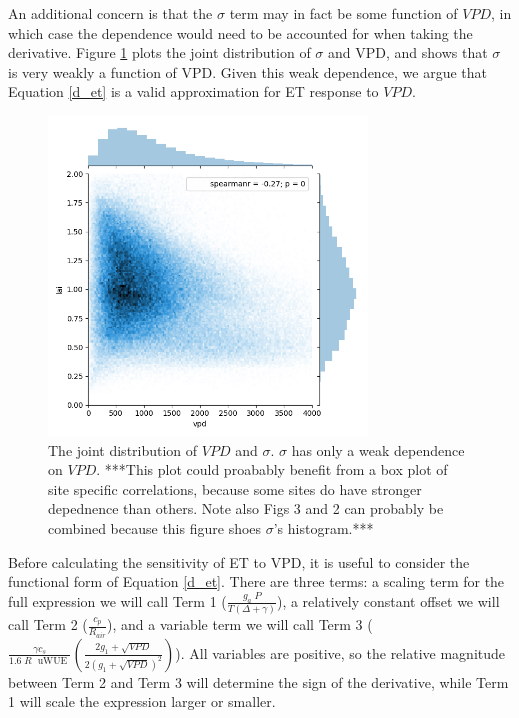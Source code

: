 \documentclass[draft,linenumbers]{agujournal}
\begin{document}
An additional concern is that the $\sigma$ term may in fact be some function of $VPD$, in which case the dependence would need to be accounted for when taking the derivative. Figure \ref{lai_vpd_fig} plots the joint distribution of $\sigma$ and VPD, and shows that $\sigma$ is very weakly a function of VPD. Given this weak dependence, we argue that Equation \ref{d_et} is a valid approximation for ET response to $VPD$.

\begin{figure}[h]
\centering
\includegraphics[width=20pc]{./fig03.png}
\caption{The joint distribution of $VPD$ and $\sigma$. $\sigma$ has only a weak dependence on $VPD$. ***This plot could proabably benefit from a box plot of site specific correlations, because some sites do have stronger depednence than others. Note also Figs 3 and 2 can probably be combined because this figure shoes $\sigma$'s histogram.***}
\label{lai_vpd_fig}
\end{figure}

Before calculating the sensitivity of ET to VPD, it is useful to consider the functional form of Equation \ref{d_et}. There are three terms: a scaling term for the full expression we will call Term 1 ($\frac{g_a \; P}{T(\Delta + \gamma)}$), a relatively constant offset we will call Term 2 ($\frac{c_p}{R_{air}}$), and a variable term we will call Term 3 ($\frac{\gamma c_s }{1.6 \; R\; \text{ uWUE }} \left( \frac{2 g_1 + \sqrt{VPD}}{2 (g_1 + \sqrt{VPD})^2}\right)$). All variables are positive, so the relative magnitude between Term 2 and Term 3 will determine the sign of the derivative, while Term 1 will scale the expression larger or smaller.
\end{document}

